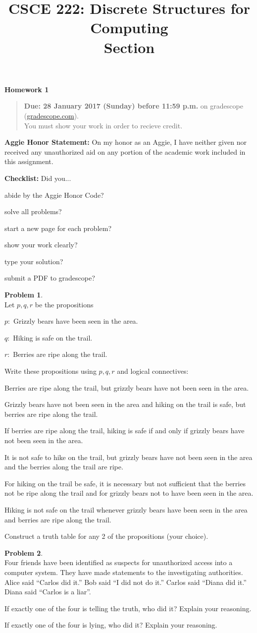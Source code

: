 \documentclass{article}
\title{CSCE 222: Discrete Structures for Computing\\Section \mysectionnumber\\\mysemester}
\author{\myname}
\date{}
\theoremstyle{definition}
\newtheorem{problem}{Problem}
\newtheorem*{solution}{Solution}
\newcommand{\honor}{\noindent \textbf{Aggie Honor Statement: }On my honor as an Aggie, I have neither
  given nor received any unauthorized aid on any portion of the academic work included in this assignment.
}
\newcommand{\checklist}{\noindent\textbf{Checklist:}
Did you...
\begin{compactenum}
\item abide by the Aggie Honor Code?
\item solve all problems?
\item start a new page for each problem?
\item show your work clearly?
\item type your solution?
\item submit a PDF to gradescope?
\end{compactenum}
}
\newcommand{\problemset}[1]{\begin{center}\textbf{Homework #1}\end{center}}
\newcommand{\duedate}[1]{\begin{quote}\textbf{Due: #1} on gradescope (\url{gradescope.com}). \\You must show your work in order to recieve credit.\end{quote}}
\newcommand{\homeworknumber}[0]{1}
\begin{document}
\maketitle
\problemset{\homeworknumber}
\duedate{28 January 2017 (Sunday) before 11:59 p.m.}
\bigskip

\honor
\bigskip

\checklist

\begin{problem}\ \\
Let $p,q,r$ be the propositions
\begin{compactenum}
\item[$p:$] Grizzly bears have been seen in the area.
\item[$q:$] Hiking is safe on the trail.
\item[$r:$] Berries are ripe along the trail.
\end{compactenum}
Write these propositions using $p,q,r$ and logical connectives:
\begin{compactenum}
\item Berries are ripe along the trail, but grizzly bears have not been seen in the area.
\item Grizzly bears have not been seen in the area and hiking on the trail is safe, but berries are ripe along the trail.
\item If berries are ripe along the trail, hiking is safe if and only if grizzly bears have not been seen in the area.
\item It is not safe to hike on the trail, but grizzly bears have not been seen in the area and the berries along the trail are ripe.
\item For hiking on the trail be safe, it is necessary but not sufficient that the berries not be ripe along the trail and for grizzly bears not to have been seen in the area.
\item Hiking is not safe on the trail whenever grizzly bears have been seen in the area and berries are ripe along the trail.
\end{compactenum}
Construct a truth table for any 2 of the propositions (your choice).
\end{problem}



\begin{problem}\ \\
Four friends have been identified as suspects for unauthorized access into a computer system.  They have made statements to the investigating authorities.  Alice said ``Carlos did it.''  Bob said ``I did not do it.''  Carlos said ``Diana did it.''  Diana said ``Carlos is a liar''.
\begin{compactenum}
\item If exactly one of the four is telling the truth, who did it?  Explain your reasoning.
\item If exactly one of the four is lying, who did it?  Explain your reasoning.
\end{compactenum}
\end{problem}
\end{document}

